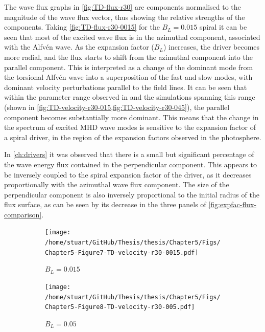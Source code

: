 \documentclass[a4paper,12pt,fourier,authoryear,custommargin]{Classes/PhDThesisPSnPDF}
\providecommand{\DIFaddtex}[1]{{\protect\color{blue}\uwave{#1}}} %
\providecommand{\DIFaddbegin}{} %
\providecommand{\DIFaddend}{} %
\providecommand{\DIFadd}[1]{\texorpdfstring{\DIFaddtex{#1}}{#1}} %
\begin{document}
The wave flux graphs in \cref{fig:TD-flux-r30} are components normalised to the magnitude of the wave flux vector, thus showing the relative strengths of the components.
Taking \cref{fig:TD-flux-r30-0015} for the $B_L=0.015$ spiral it can be seen that most of the excited wave flux is in the azimuthal component, associated with the Alfv\'en wave.
As the expansion factor ($B_L$) increases, the driver becomes more radial, and the flux starts to shift from the azimuthal component into the parallel component.
This is interpreted as a change of the dominant mode from the torsional Alfv\'en wave into a superposition of the fast and slow modes, with dominant velocity perturbations parallel to the field lines.
It can be seen that within the parameter range observed in\DIFaddbegin \DIFadd{~}\DIFaddend \cite{bonet2008} and the simulations spanning this range (shown in \cref{fig:TD-velocity-r30-015,fig:TD-velocity-r30-045}), the parallel component becomes substantially more dominant.
This means that the change in the spectrum of excited MHD wave modes is sensitive to the expansion factor of a spiral driver, in the region of the expansion factors observed in the photosphere.

In \cref{ch:drivers} it was observed that there is a small but significant percentage of the wave energy flux contained in the perpendicular component.
This appears to be inversely coupled to the spiral expansion factor of the driver, as it decreases proportionally with the azimuthal wave flux component.
The size of the perpendicular component is also inversely proportional to the initial radius of the flux surface, as can be seen by its decrease in the three panels of \cref{fig:expfac-flux-comparison}.



\begin{figure}
    \centering


    \begin{subfigure}[b]{0.9\columnwidth}
        \texttt{[image: /home/stuart/GitHub/Thesis/thesis/Chapter5/Figs/Chapter5-Figure7-TD-velocity-r30-0015.pdf]}
        \caption{$B_L = 0.015$}
        \label{fig:TD-velocity-r30-0015}
    \end{subfigure}

    \begin{subfigure}[b]{0.9\columnwidth}
        \texttt{[image: /home/stuart/GitHub/Thesis/thesis/Chapter5/Figs/Chapter5-Figure8-TD-velocity-r30-005.pdf]}
        \caption{$B_L = 0.05$}
        \label{fig:TD-velocity-r30-005}
    \end{subfigure}
    \caption{}
    \label{fig:}
\end{figure}
\end{document}
